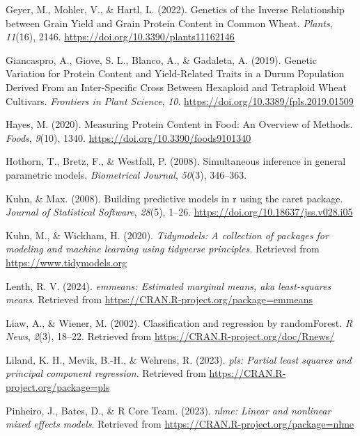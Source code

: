 \documentclass[
]{agujournal2019}
\newlength{\cslhangindent}
\newenvironment{CSLReferences}[2] %
 {\begin{list}{}{%
  \setlength{\itemindent}{0pt}
  \setlength{\leftmargin}{0pt}
  \setlength{\parsep}{0pt}
  \ifodd #1
   \setlength{\leftmargin}{\cslhangindent}
   \setlength{\itemindent}{-1\cslhangindent}
  \fi
  \setlength{\itemsep}{#2\baselineskip}}}
 {\end{list}}
\begin{document}
\begin{CSLReferences}{1}{0}
Geyer, M., Mohler, V., \& Hartl, L. (2022). Genetics of the {Inverse}
{Relationship} between {Grain} {Yield} and {Grain} {Protein} {Content}
in {Common} {Wheat}. \emph{Plants}, \emph{11}(16), 2146.
\url{https://doi.org/10.3390/plants11162146}

Giancaspro, A., Giove, S. L., Blanco, A., \& Gadaleta, A. (2019).
Genetic {Variation} for {Protein} {Content} and {Yield}-{Related}
{Traits} in a {Durum} {Population} {Derived} {From} an
{Inter}-{Specific} {Cross} {Between} {Hexaploid} and {Tetraploid}
{Wheat} {Cultivars}. \emph{Frontiers in Plant Science}, \emph{10}.
\url{https://doi.org/10.3389/fpls.2019.01509}

Hayes, M. (2020). Measuring {Protein} {Content} in {Food}: {An}
{Overview} of {Methods}. \emph{Foods}, \emph{9}(10), 1340.
\url{https://doi.org/10.3390/foods9101340}

Hothorn, T., Bretz, F., \& Westfall, P. (2008). Simultaneous inference
in general parametric models. \emph{Biometrical Journal}, \emph{50}(3),
346--363.

Kuhn, \& Max. (2008). Building predictive models in r using the caret
package. \emph{Journal of Statistical Software}, \emph{28}(5), 1--26.
\url{https://doi.org/10.18637/jss.v028.i05}

Kuhn, M., \& Wickham, H. (2020). \emph{{Tidymodels}: A collection of
packages for modeling and machine learning using tidyverse principles.}
Retrieved from \url{https://www.tidymodels.org}

Lenth, R. V. (2024). \emph{{emmeans}: Estimated marginal means, aka
least-squares means}. Retrieved from
\url{https://CRAN.R-project.org/package=emmeans}

Liaw, A., \& Wiener, M. (2002). Classification and regression by
randomForest. \emph{R News}, \emph{2}(3), 18--22. Retrieved from
\url{https://CRAN.R-project.org/doc/Rnews/}

Liland, K. H., Mevik, B.-H., \& Wehrens, R. (2023). \emph{{pls}: Partial
least squares and principal component regression}. Retrieved from
\url{https://CRAN.R-project.org/package=pls}

Pinheiro, J., Bates, D., \& R Core Team. (2023). \emph{{nlme}: Linear
and nonlinear mixed effects models}. Retrieved from
\url{https://CRAN.R-project.org/package=nlme}


\end{CSLReferences}
\end{document}
